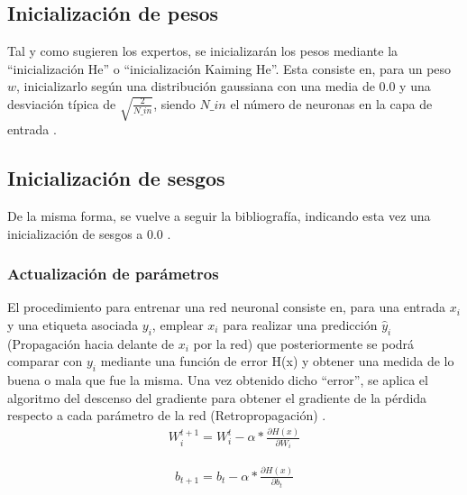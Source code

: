\subsection{Inicialización de pesos}
Tal y como sugieren los expertos, se inicializarán los pesos mediante la ``inicialización He'' o ``inicialización Kaiming He''. Esta consiste en, para un peso $w$, inicializarlo según una distribución gaussiana con una media de 0.0 y una desviación típica de $\sqrt{\frac{2}{N\_in}}$, siendo $N\_in$ el número de neuronas en la capa de entrada
\cite{ini_He} \cite{ini_He_2} \cite{ini_He_code} \cite{importancia_ReLU} \cite{importancia_ReLU_2}.

\subsection{Inicialización de sesgos}

De la misma forma, se vuelve a seguir la bibliografía, indicando esta vez una inicialización de sesgos a 0.0 \cite{ini_bias} \cite{ini_bias_2}.

\subsubsection{Actualización de parámetros}
El procedimiento para entrenar una red neuronal consiste en, para una entrada $x_i$ y una etiqueta asociada $y_i$, emplear $x_i$ para realizar una predicción $\hat{y}_i$ (Propagación hacia delante de $x_i$ por la red) que posteriormente se podrá comparar con $y_i$ mediante una función de error H(x) y obtener una medida de lo buena o mala que fue la misma. Una vez obtenido dicho ``error'', se aplica el algoritmo del descenso del gradiente para obtener el gradiente de la pérdida respecto a cada parámetro de la red (Retropropagación) \cite{Cross_entropy}. \\

\begin{gather}
	W^{t+1}_i = W^{t}_i - \alpha * \frac{\partial H(x)}{\partial W_{i}} 
	\label{act_pesos}
\end{gather}

\begin{gather}
	b_{t+1} = b_{t} - \alpha * \frac{\partial H(x)}{\partial b_{t}}
	\label{act_bias}
\end{gather}


